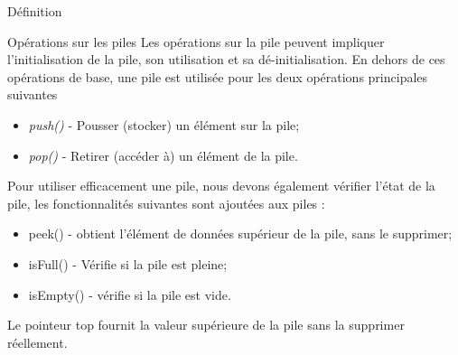 \documentclass[10pt,xcolor=dvipsnames]{beamer}
\begin{document}
\begin{frame}{Définition}

\end{frame}

\begin{frame}{Opérations sur les piles}
    Les opérations sur la pile peuvent impliquer l'initialisation de la pile, son utilisation et sa dé-initialisation. En dehors de ces opérations de base, une pile est utilisée pour les deux opérations principales suivantes
\begin{itemize}
    \item \textit{push()} - Pousser (stocker) un élément sur la pile;
    \item \textit{pop()} - Retirer (accéder à) un élément de la pile.
\end{itemize}
   
Pour utiliser efficacement une pile, nous devons également vérifier l'état de la pile, les fonctionnalités suivantes sont ajoutées aux piles : 

\begin{itemize}
    \item peek() - obtient l'élément de données supérieur de la pile, sans le supprimer;
    \item isFull() - Vérifie si la pile est pleine;
    \item isEmpty() - vérifie si la pile est vide.
\end{itemize}
    Le pointeur \alert{top} fournit la valeur supérieure de la pile sans la supprimer réellement.
\end{frame}
\end{document}
